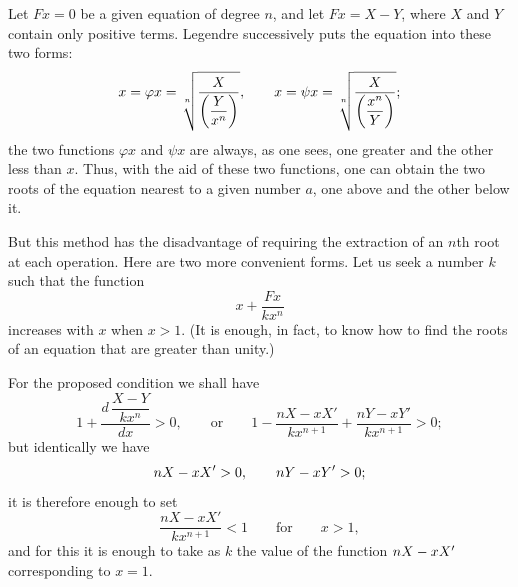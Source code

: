 Let $Fx=0$ be a given equation of degree $n$, and let $Fx=X-Y$,
where $X$ and $Y$ contain only positive terms. Legendre successively
puts the equation into these two forms:
\[
x=\varphi x=\sqrt[n]{\frac{X}{\left(\dfrac{Y}{x^n}\right)}},
\qquad
\GalSourceError{x=\psi x=\sqrt[n]{\frac{X}{\left(\dfrac{x^n}{Y}\right)}}}{W06-PE001: the printed second radical is not in general equivalent to F(x)=0 and need not be the opposite-side fixed-point map; preserve it and consult the separate exact certificate};
\]
the two functions $\varphi x$ and $\psi x$ are always, as one sees,
one greater and the other less than $x$. Thus, with the aid of these two
functions, one can obtain the two roots of the equation nearest to a
given number $a$, one above and the other below it.



But this method has the disadvantage of requiring the extraction of an
$n$th root at each operation. Here are two more convenient forms. Let us
seek a number $k$ such that the function
\[
x+\frac{Fx}{kx^n}
\]
increases with $x$ when $x>1$. (It is enough, in fact, to know how to
find the roots of an equation that are greater than unity.)

For the proposed condition we shall have
\[
1+\frac{d\,\dfrac{X-Y}{kx^n}}{dx}>0,
\qquad\text{or}\qquad
1-\frac{nX-xX'}{kx^{n+1}}+\frac{nY-xY'}{kx^{n+1}}>0;
\]
but identically we have
\[
\GalSourceError{nX-xX'>0,\qquad nY-xY'>0}{W06-SE001: strict positivity is false for admissible positive-term decompositions, and the prescribed value k=(nX-xX')|_{x=1} can therefore be zero};
\]
it is therefore enough to set
\[
\frac{nX-xX'}{kx^{n+1}}<1\qquad\text{for}\qquad x>1,
\]
and for this it is enough to take as $k$ the value of the function
$\GalSourceError{nX-xX'}{W06-SE001}$ corresponding to $x=1$.

